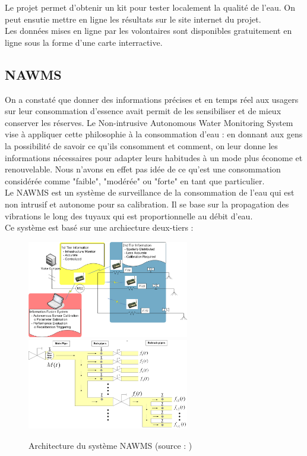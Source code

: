 \documentclass[10pt, article]{llncs}
\begin{document}
		Le projet permet d'obtenir un kit pour tester localement la qualité de l'eau. On peut ensutie mettre en ligne les résultats sur le site internet du projet.\\
		Les données mises en ligne par les volontaires sont disponibles gratuitement en ligne sous la forme d'une carte interractive.
		
	\subsection{NAWMS}
		On a constaté que donner des informations précises et en temps réel aux usagers sur leur consommation d'essence avait permit de les sensibiliser et de mieux conserver les réserves. Le Non-intrusive Autonomous Water Monitoring System vise à appliquer cette philosophie à la consommation d'eau : en donnant aux gens la possibilité de savoir ce qu'ils consomment et comment, on leur donne les informations nécessaires pour adapter leurs habitudes à un mode plus économe et renouvelable. Nous n'avons en effet pas idée de ce qu'est une consommation considérée comme "faible", "modérée" ou "forte" en tant que particulier.\\
		Le NAWMS est un système de surveillance de la consommation de l'eau qui est non intrusif et autonome pour sa calibration. Il se base sur la propagation des vibrations le long des tuyaux qui est proportionnelle au débit d'eau.\\
		Ce système est basé sur une archiecture deux-tiers :
		\begin{figure}
			\includegraphics[width=200pt]{img/nawms.png}
			\includegraphics[width=200pt]{img/nawms2.png}
			\caption{Architecture du système NAWMS (source : \cite{kim_nawms:_2008})}
		\end{figure}
\end{document}
